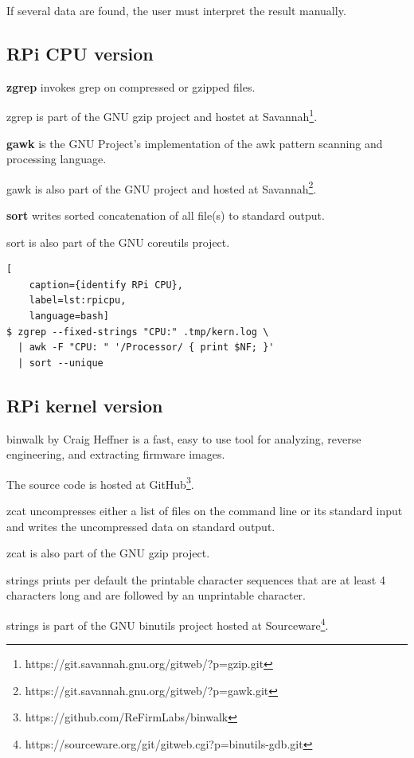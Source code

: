 If several data are found, the user must interpret the result manually.

\subsection{RPi CPU version}

\textbf{zgrep} invokes grep on compressed or gzipped files.

zgrep is part of the GNU gzip project and hostet at Savannah\footnote{https://git.savannah.gnu.org/gitweb/?p=gzip.git}.

\textbf{gawk} is the GNU Project's implementation of the awk pattern scanning and processing language.

gawk is also part of the GNU project and hosted at Savannah\footnote{https://git.savannah.gnu.org/gitweb/?p=gawk.git}.

\textbf{sort} writes sorted concatenation of all file(s) to standard output.

sort is also part of the GNU coreutils project.

\begin{lstlisting}[
    caption={identify RPi CPU},
    label=lst:rpicpu,
    language=bash]
$ zgrep --fixed-strings "CPU:" .tmp/kern.log \
  | awk -F "CPU: " '/Processor/ { print $NF; }'
  | sort --unique
\end{lstlisting}

\subsection{RPi kernel version}

binwalk by Craig Heffner is a fast, easy to use tool for analyzing, reverse engineering, and extracting firmware images.

The source code is hosted at GitHub\footnote{https://github.com/ReFirmLabs/binwalk}.

zcat uncompresses either a list of files on the command line or its standard input and writes the uncompressed data on standard output.

zcat is also part of the GNU gzip project.

strings prints per default the printable character sequences that are at least 4 characters long and are followed by an unprintable character.

strings is part of the GNU binutils project hosted at Sourceware\footnote{https://sourceware.org/git/gitweb.cgi?p=binutils-gdb.git}.

